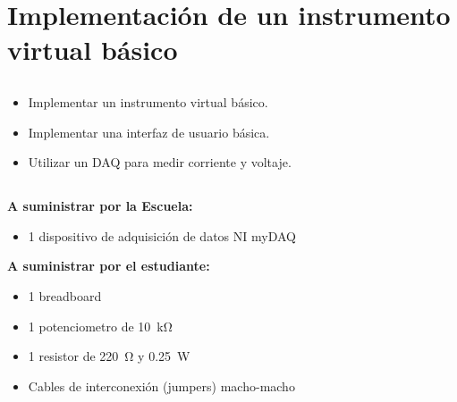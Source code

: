 \chapter{Implementación de un instrumento virtual básico}
\section{\obj}
\capacidad
\begin{itemize}
\item Implementar un instrumento virtual básico.
\item Implementar una interfaz de usuario básica.
\item Utilizar un DAQ para medir corriente y voltaje.
\end{itemize}

\section{\mat}
\textbf{A suministrar por la Escuela:}
\begin{itemize}
\item 1 dispositivo de adquisición de datos NI myDAQ

\end{itemize}
\textbf{A suministrar por el estudiante:}
\begin{itemize}
\item 1 breadboard
\item 1 potenciometro de \SI{10}{\kilo\ohm}
\item 1 resistor de \SI{220}{\ohm} y \SI{0.25}{\watt}
\item Cables de interconexión (jumpers) macho-macho
\end{itemize}


